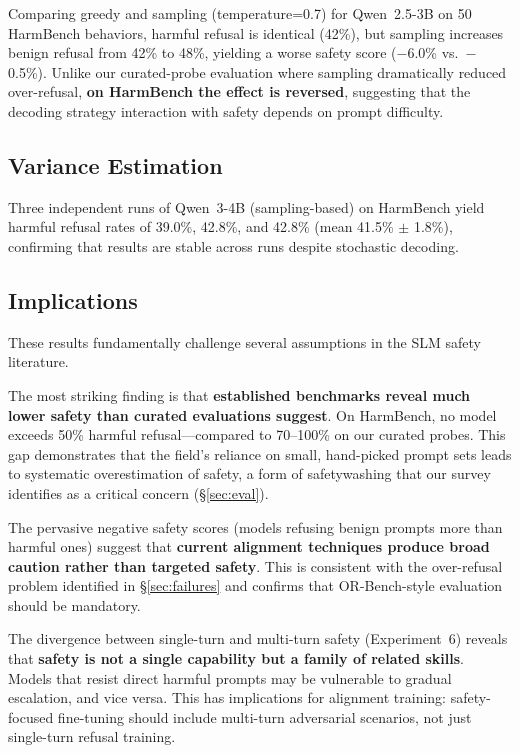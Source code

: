 \documentclass[12pt,a4paper]{article}
\begin{document}
Comparing greedy and sampling (temperature=0.7) for Qwen~2.5-3B on 50 HarmBench behaviors, harmful refusal is identical (42\%), but sampling increases benign refusal from 42\% to 48\%, yielding a worse safety score ($-$6.0\% vs.\ $-$0.5\%). Unlike our curated-probe evaluation where sampling dramatically reduced over-refusal, \textbf{on HarmBench the effect is reversed}, suggesting that the decoding strategy interaction with safety depends on prompt difficulty.

\subsection{Variance Estimation}

Three independent runs of Qwen~3-4B (sampling-based) on HarmBench yield harmful refusal rates of 39.0\%, 42.8\%, and 42.8\% (mean 41.5\% $\pm$ 1.8\%), confirming that results are stable across runs despite stochastic decoding.

\subsection{Implications}

These results fundamentally challenge several assumptions in the SLM safety literature.

The most striking finding is that \textbf{established benchmarks reveal much lower safety than curated evaluations suggest}. On HarmBench, no model exceeds 50\% harmful refusal---compared to 70--100\% on our curated probes. This gap demonstrates that the field's reliance on small, hand-picked prompt sets leads to systematic overestimation of safety, a form of safetywashing that our survey identifies as a critical concern (\S\ref{sec:eval}).

The pervasive negative safety scores (models refusing benign prompts more than harmful ones) suggest that \textbf{current alignment techniques produce broad caution rather than targeted safety}. This is consistent with the over-refusal problem identified in \S\ref{sec:failures} and confirms that OR-Bench-style evaluation should be mandatory.

The divergence between single-turn and multi-turn safety (Experiment~6) reveals that \textbf{safety is not a single capability but a family of related skills}. Models that resist direct harmful prompts may be vulnerable to gradual escalation, and vice versa. This has implications for alignment training: safety-focused fine-tuning should include multi-turn adversarial scenarios, not just single-turn refusal training.
\end{document}
